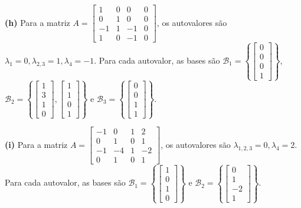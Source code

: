\begin{resolution}
  \vspace{12pt}
  {\bf (h)} Para a matriz \( A = \begin{bmatrix} 1 & 0 & 0 & 0 \\ 0 & 1 & 0 & 0 \\ -1 & 1 & -1 & 0 \\ 1 & 0 & -1 & 0 \end{bmatrix} \), os autovalores são \( \lambda_{1} = 0, \lambda_{2, 3} = 1, \lambda_4 = -1\).  Para cada autovalor, as bases são \( \mathcal{B}_1 = \left\{ \begin{bmatrix} 0 \\ 0 \\ 0 \\ 1 \end{bmatrix} \right\} \), \( \mathcal{B}_2 = \left\{ \begin{bmatrix} 1 \\ 3 \\ 1 \\ 0 \end{bmatrix}, \begin{bmatrix} 1 \\ 1 \\ 0 \\ 1 \end{bmatrix} \right\} \) e \( \mathcal{B}_3 = \left\{ \begin{bmatrix} 0 \\ 0 \\ 1 \\ 1 \end{bmatrix} \right\} \).

  \vspace{12pt}
  {\bf (i)} Para a matriz \( A = \begin{bmatrix} -1 & 0 & 1 & 2 \\ 0 & 1 & 0 & 1 \\ -1 & -4 & 1 & -2 \\ 0 & 1 & 0 & 1 \end{bmatrix} \), os autovalores são \( \lambda_{1, 2, 3} = 0, \lambda_4 = 2\).  Para cada autovalor, as bases são \( \mathcal{B}_1 = \left\{ \begin{bmatrix} 1 \\ 0 \\ 1 \\ 0 \end{bmatrix} \right\} \) e \( \mathcal{B}_2 = \left\{ \begin{bmatrix} 0 \\ 1 \\ -2 \\ 1 \end{bmatrix}\right\} \).

\end{resolution}

